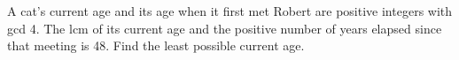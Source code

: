 A cat's current age and its age when it first met Robert are positive integers with gcd 4. The lcm of its current age and the positive number of years elapsed since that meeting is 48. Find the least possible current age.
